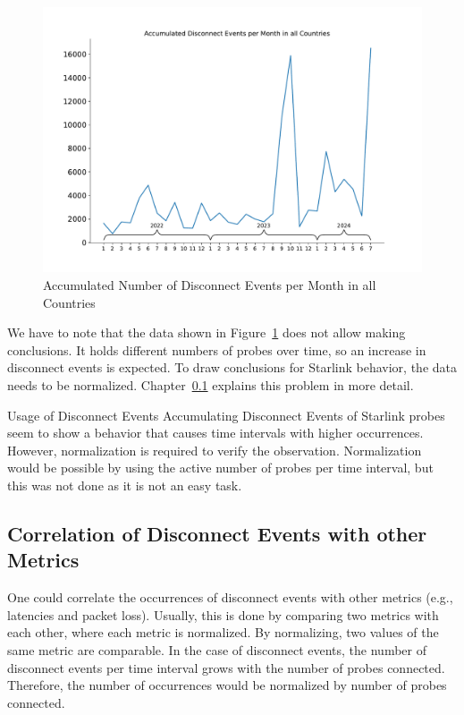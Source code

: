 \begin{figure}
	\centering
	\includegraphics[width=.7\linewidth]{./chapters/4-results/disconnect_events/accumulated_disconnect_events_per_month_in_all_countries.pdf}
	\caption{Accumulated Number of Disconnect Events per Month in all
		Countries}
	\label{fig:disconnect-events-absolute-all-countries}
\end{figure}

We have to note that the data shown in
Figure~\ref{fig:disconnect-events-absolute-all-countries} does not allow making
conclusions. It holds different numbers of probes over time, so an increase in
disconnect events is expected. To draw conclusions for Starlink behavior, the
data needs to be normalized. Chapter~\ref{sec:correlation-disconnect-events}
explains this problem in more detail.

\begin{takeaway}{Usage of Disconnect Events}
	Accumulating Disconnect Events of Starlink probes seem to show a
	behavior that causes time intervals with higher occurrences. However,
	normalization is required to verify the observation. Normalization
	would be possible by using the active number of probes per time
	interval, but this was not done as it is not an easy task.
\end{takeaway}

\subsection{Correlation of Disconnect Events with other Metrics}
\label{sec:correlation-disconnect-events}

One could correlate the occurrences of disconnect events with other metrics
(e.g., latencies and packet loss). Usually, this is done by comparing two
metrics with each other, where each metric is normalized. By normalizing, two
values of the same metric are comparable. In the case of disconnect events, the
number of disconnect events per time interval grows with the number of probes
connected. Therefore, the number of occurrences would be normalized by number
of probes connected.

